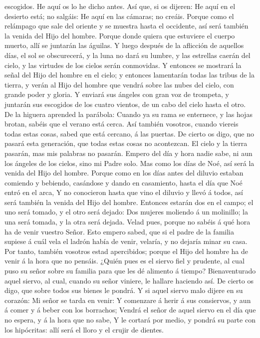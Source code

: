 escogidos.  He aquí os lo he dicho antes.  Así
que, si os dijeren: He aquí en el desierto está; no salgáis: He aquí en
las cámaras; no creáis.  Porque como el relámpago que sale
del oriente y se muestra hasta el occidente, así será también la venida
del Hijo del hombre.  Porque donde quiera que estuviere el
cuerpo muerto, allí se juntarán las águilas.  Y luego
después de la aflicción de aquellos días, el sol se obscurecerá, y la
luna no dará su lumbre, y las estrellas caerán del cielo, y las virtudes
de los cielos serán conmovidas.  Y entonces se mostrará la
señal del Hijo del hombre en el cielo; y entonces lamentarán todas las
tribus de la tierra, y verán al Hijo del hombre que vendrá sobre las
nubes del cielo, con grande poder y gloria.  Y enviará sus
ángeles con gran voz de trompeta, y juntarán sus escogidos de los cuatro
vientos, de un cabo del cielo hasta el otro.  De la higuera
aprended la parábola: Cuando ya su rama se enternece, y las hojas
brotan, sabéis que el verano está cerca.  Así también
vosotros, cuando viereis todas estas cosas, sabed que está cercano, á
las puertas.  De cierto os digo, que no pasará esta
generación, que todas estas cosas no acontezcan.  El cielo
y la tierra pasarán, mas mis palabras no pasarán.  Empero
del día y hora nadie sabe, ni aun los ángeles de los cielos, sino mi
Padre solo.  Mas como los días de Noé, así será la venida
del Hijo del hombre.  Porque como en los días antes del
diluvio estaban comiendo y bebiendo, casándose y dando en casamiento,
hasta el día que Noé entró en el arca,  Y no conocieron
hasta que vino el diluvio y llevó á todos, así será también la venida
del Hijo del hombre.  Entonces estarán dos en el campo; el
uno será tomado, y el otro será dejado:  Dos mujeres
moliendo á un molinillo; la una será tomada, y la otra será dejada.
 Velad pues, porque no sabéis á qué hora ha de venir
vuestro Señor.  Esto empero sabed, que si el padre de la
familia supiese á cuál vela el ladrón había de venir, velaría, y no
dejaría minar su casa.  Por tanto, también vosotros estad
apercibidos; porque el Hijo del hombre ha de venir á la hora que no
pensáis.  ¿Quién pues es el siervo fiel y prudente, al cual
puso su señor sobre su familia para que les dé alimento á tiempo?
 Bienaventurado aquel siervo, al cual, cuando su señor
viniere, le hallare haciendo así.  De cierto os digo, que
sobre todos sus bienes le pondrá.  Y si aquel siervo malo
dijere en su corazón: Mi señor se tarda en venir:  Y
comenzare á herir á sus consiervos, y aun á comer y á beber con los
borrachos;  Vendrá el señor de aquel siervo en el día que
no espera, y á la hora que no sabe,  Y le cortará por
medio, y pondrá su parte con los hipócritas: allí será el lloro y el
crujir de dientes.

